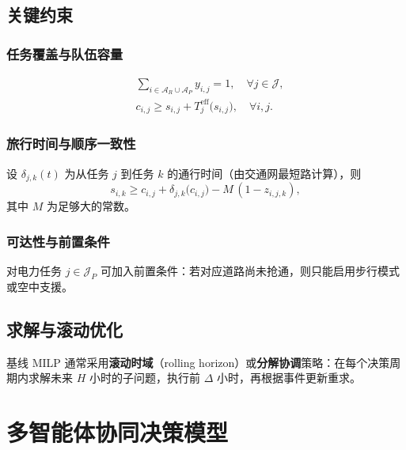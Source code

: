 \documentclass[UTF8,zihao=-4,a4paper,fontset=fandol]{ctexrep}
\begin{document}
\section{关键约束}
\subsection{任务覆盖与队伍容量}
\begin{align}
  &\sum_{i\in\mathcal{A}_R\cup\mathcal{A}_P} y_{i,j} = 1, \quad \forall j\in\mathcal{J},\\
  &c_{i,j} \ge s_{i,j} + T_j^{\text{eff}}\big(s_{i,j}\big), \quad \forall i,j.
\end{align}

\subsection{旅行时间与顺序一致性}
设 $\delta_{j,k}(t)$ 为从任务 $j$ 到任务 $k$ 的通行时间（由交通网最短路计算），则
\begin{equation}
  s_{i,k} \ge c_{i,j} + \delta_{j,k}\big(c_{i,j}\big) - M\,(1-z_{i,j,k}),
\end{equation}
其中 $M$ 为足够大的常数。

\subsection{可达性与前置条件}
对电力任务 $j\in\mathcal{J}_P$ 可加入前置条件：若对应道路尚未抢通，则只能启用步行模式或空中支援。

\section{求解与滚动优化}
基线 MILP 通常采用\textbf{滚动时域}（rolling horizon）或\textbf{分解协调}策略：在每个决策周期内求解未来 $H$ 小时的子问题，执行前 $\Delta$ 小时，再根据事件更新重求。

\chapter{多智能体协同决策模型}\label{ch:marl}
\end{document}
